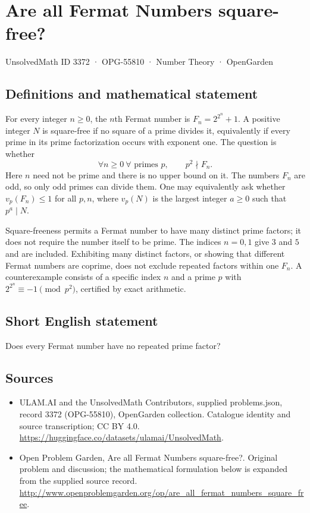 \documentclass[11pt,a4paper]{article}
\begin{document}
\section*{Are all Fermat Numbers square-free?}\label{3372}
{\small UnsolvedMath ID 3372 · OPG-55810 · Number Theory · OpenGarden}
\subsection{Definitions and mathematical statement}
For every integer $n\ge0$, the $n$th Fermat number is
$F_n=2^{2^n}+1$. A positive integer $N$ is square-free if no square
of a prime divides it, equivalently if every prime in its prime
factorization occurs with exponent one. The question is whether
\[
 \forall n\ge0\ \forall\text{ primes }p,\qquad p^2\nmid F_n.
\]
Here $n$ need not be prime and there is no upper bound on it. The
numbers $F_n$ are odd, so only odd primes can divide them. One may
equivalently ask whether $v_p(F_n)\le1$ for all $p,n$, where
$v_p(N)$ is the largest integer $a\ge0$ such that $p^a\mid N$.

Square-freeness permits a Fermat number to have many distinct prime
factors; it does not require the number itself to be prime. The
indices $n=0,1$ give $3$ and $5$ and are included. Exhibiting many
distinct factors, or showing that different Fermat numbers are
coprime, does not exclude repeated factors within one $F_n$.
A counterexample consists of a specific index $n$ and a prime $p$
with $2^{2^n}\equiv-1\pmod{p^2}$, certified by exact arithmetic.
\subsection{Short English statement}
Does every Fermat number have no repeated prime factor?
\subsection{Sources}
\begin{itemize}
\item[S1] ULAM.AI and the UnsolvedMath Contributors, supplied problems.json, record 3372 (OPG-55810), OpenGarden collection. Catalogue identity and source transcription; CC BY 4.0.
\url{https://huggingface.co/datasets/ulamai/UnsolvedMath}.
\item[S2] Open Problem Garden, Are all Fermat Numbers square-free?. Original problem and discussion; the mathematical formulation below is expanded from the supplied source record.
\url{http://www.openproblemgarden.org/op/are_all_fermat_numbers_square_free}.
\end{itemize}
\end{document}
